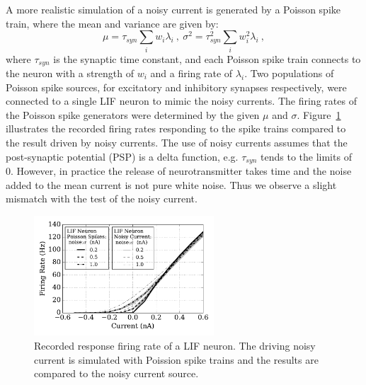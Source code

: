 	A more realistic simulation of a noisy current is generated by a Poisson spike train, 
	where the mean and variance are given by:
	\begin{equation}
	\mu = \tau_{syn}\sum_i w_i\lambda_{i}~,~\sigma^2=\tau_{syn}^{2}\sum_i w_i^2\lambda_{i}~,
	\end{equation}
	where $\tau_{syn}$ is the synaptic time constant, and each Poisson spike train connects to the neuron with a strength of $w_i$ and a firing rate of $\lambda_i$.
	Two populations of Poisson spike sources, for excitatory and inhibitory synapses respectively, were connected to a single LIF neuron to mimic the noisy currents.
	The firing rates of the Poisson spike generators were determined by the given $\mu$ and $\sigma$.
	Figure~\ref{Fig:lif_pois} illustrates the recorded firing rates responding to the spike trains compared to the result driven by noisy currents.
	The use of noisy currents assumes that the post-synaptic potential (PSP) is a delta function, e.g. $\tau_{syn}$ tends to the limits of 0.
	However, in practice the release of neurotransmitter takes time and the noise added to the mean current is not pure white noise.
	Thus we observe a slight mismatch with the test of the noisy current. %
	\begin{figure}
		\centering
		\includegraphics[width=0.6\textwidth]{pics_iconip/3-1.pdf}
		\caption{Recorded response firing rate of a LIF neuron.
			The driving noisy current is simulated with Poission spike trains and the results are compared to the noisy current source.}
		\label{Fig:lif_pois}
	\end{figure}	
